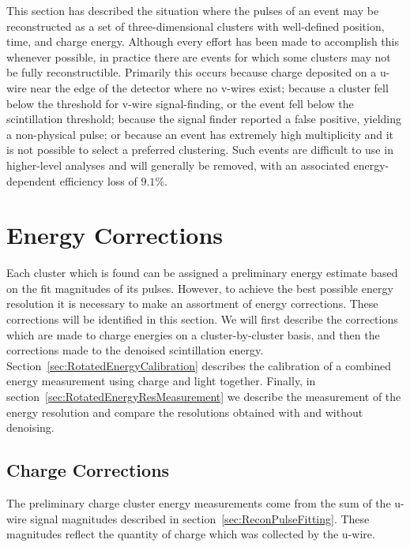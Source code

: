 This section has described the situation where the pulses of an event may be reconstructed as a set of three-dimensional clusters with well-defined position, time, and charge energy.  Although every effort has been made to accomplish this whenever possible, in practice there are events for which some clusters may not be fully reconstructible.  Primarily this occurs because charge deposited on a u-wire near the edge of the detector where no v-wires exist; because a cluster fell below the threshold for v-wire signal-finding, or the event fell below the scintillation threshold; because the signal finder reported a false positive, yielding a non-physical pulse; or because an event has extremely high multiplicity and it is not possible to select a preferred clustering.  Such events are difficult to use in higher-level analyses and will generally be removed, with an associated energy-dependent efficiency loss of $9.1\%$.~\cite{NewEXObb0nPaper_2014}

\section{Energy Corrections}\label{sec:ResultEnergy}

Each cluster which is found can be assigned a preliminary energy estimate based on the fit magnitudes of its pulses.  However, to achieve the best possible energy resolution it is necessary to make an assortment of energy corrections.  These corrections will be identified in this section.  We will first describe the corrections which are made to charge energies on a cluster-by-cluster basis, and then the corrections made to the denoised scintillation energy.  Section~\ref{sec:RotatedEnergyCalibration} describes the calibration of a combined energy measurement using charge and light together.  Finally, in section~\ref{sec:RotatedEnergyResMeasurement} we describe the measurement of the energy resolution and compare the resolutions obtained with and without denoising.

\subsection{Charge Corrections}\label{sec:ResultEnergyCharge}

The preliminary charge cluster energy measurements come from the sum of the u-wire signal magnitudes described in section~\ref{sec:ReconPulseFitting}.  These magnitudes reflect the quantity of charge which was collected by the u-wire.

